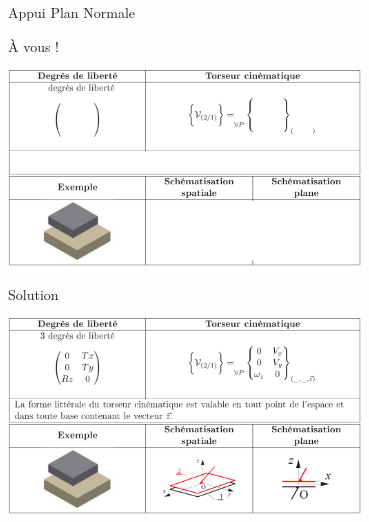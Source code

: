 \documentclass[
  ignorenonframetext,
  aspectratio=169,
  c]{beamer}
\begin{document}
\begin{frame}{Appui Plan Normale}
\label{appui-plan-normale}
\begin{block}{À vous !}
\begin{center}
\includegraphics[width=0.7\textwidth,height=\textheight]{CM3/Liaison-Plan-00.png}
\end{center}
\end{block}

\begin{block}{Solution}
\begin{center}
\includegraphics[width=0.7\textwidth,height=\textheight]{CM3/Liaison-Plan-01.png}
\end{center}
\end{block}
\end{frame}
\end{document}
